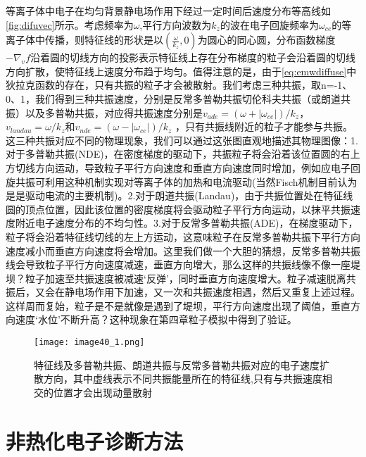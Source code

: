 等离子体中电子在均匀背景静电场作用下经过一定时间后速度分布等高线如\autoref{fig:difuvec}所示。考虑频率为$\omega$,平行方向波数为$k_z$的波在电子回旋频率为$\omega_{ce}$的等离子体中传播，则特征线的形状是以$(\frac{ω}{k_{z}} ,0)$为圆心的同心圆，分布函数梯度 $-∇_v f$沿着圆的切线方向的投影表示特征线上存在分布梯度的粒子会沿着圆的切线方向扩散，使特征线上速度分布趋于均匀。值得注意的是，由于\autoref{eq:emwdiffuse}中狄拉克函数的存在，只有共振的粒子才会被散射。我们考虑三种共振，取n=-1、0、1，我们得到三种共振速度，分别是反常多普勒共振切伦科夫共振（或朗道共振）以及多普勒共振，对应得共振速度分别是$v_{ade}=(ω+|ω_{ce} |)/k_z $，$v_{landau}=ω/k_z $和$v_{nde}=(ω-|ω_{ce} |)/k_z$ ，只有共振线附近的粒子才能参与共振。这三种共振对应不同的物理现象，我们可以通过这张图直观地描述其物理图像：1.对于多普勒共振(NDE)，在密度梯度的驱动下，共振粒子将会沿着该位置圆的右上方切线方向运动，导致粒子平行方向速度和垂直方向速度同时增加，例如应电子回旋共振可利用这种机制实现对等离子体的加热和电流驱动(当然Fisch机制目前认为是是驱动电流的主要机制\cite{RN2131})。2.对于朗道共振(Landau)，由于共振位置处在特征线圆的顶点位置，因此该位置的密度梯度将会驱动粒子平行方向运动，以抹平共振速度附近电子速度分布的不均匀性。3.对于反常多普勒共振(ADE)，在梯度驱动下，粒子将会沿着特征线切线的左上方运动，这意味粒子在反常多普勒共振下平行方向速度减小而垂直方向速度将会增加。这里我们做一个大胆的猜想，反常多普勒共振线会导致粒子平行方向速度减速，垂直方向增大，那么这样的共振线像不像一座堤坝？粒子加速至共振速度被减速‘反弹’，同时垂直方向速度增大。粒子减速脱离共振后，又会在静电场作用下加速，又一次和共振速度相遇，然后又重复上述过程。这样周而复始，粒子是不是就像是遇到了堤坝，平行方向速度出现了阈值，垂直方向速度‘水位’不断升高？这种现象在第四章粒子模拟中得到了验证。
\begin{figure}
\centering
\texttt{[image: image40\_1.png]}
\caption{\label{fig:difuvec}特征线及多普勒共振、朗道共振与反常多普勒共振对应的电子速度扩散方向，其中虚线表示不同共振能量所在的特征线,只有与共振速度相交的位置才会出现动量散射}
\end{figure}\par

\section{非热化电子诊断方法 }

